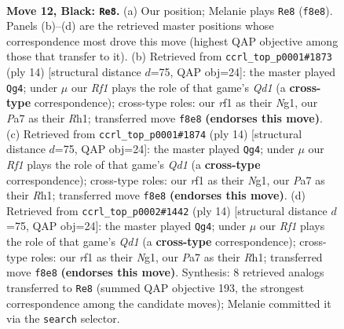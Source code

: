 \documentclass[11pt]{article}
\begin{document}
\clearpage

\begin{figure}[p]\centering
\begin{subfigure}{0.46\textwidth}\centering
\resizebox{\linewidth}{!}{%
\newchessgame
\chessboard[
  setfen={rn3rk1/ppp1bp1p/3q2p1/3pNb2/3P1P1P/6P1/PP2P3/RNBQ1RK1 b - - 0 12},
  showmover=false,
  pgfstyle=straightmove, color=movearrow, markmove={f8-e8}
]}
\caption{}
\end{subfigure}\hfill
\begin{subfigure}{0.46\textwidth}\centering
\resizebox{\linewidth}{!}{%
\newchessgame
\chessboard[
  setfen={rnbqk2r/ppp2pp1/4p2p/3pP3/3Pn3/2P5/P1PB1PPP/R2QKBNR w KQkq - 1 8},
  showmover=false,
  pgfstyle=straightmove, color=movearrow, markmove={d1-g4}
]}
\caption{}
\end{subfigure}
\\[4pt]
\begin{subfigure}{0.46\textwidth}\centering
\resizebox{\linewidth}{!}{%
\newchessgame
\chessboard[
  setfen={rnbqk2r/ppp2pp1/4p2p/3pP3/3Pn3/2P5/P1PB1PPP/R2QKBNR w KQkq - 1 8},
  showmover=false,
  pgfstyle=straightmove, color=movearrow, markmove={d1-g4}
]}
\caption{}
\end{subfigure}\hfill
\begin{subfigure}{0.46\textwidth}\centering
\resizebox{\linewidth}{!}{%
\newchessgame
\chessboard[
  setfen={rnbqk2r/ppp2pp1/4p2p/3pP3/3Pn3/2P5/P1PB1PPP/R2QKBNR w KQkq - 1 8},
  showmover=false,
  pgfstyle=straightmove, color=movearrow, markmove={d1-g4}
]}
\caption{}
\end{subfigure}
\caption{\textbf{Move 12, Black: \texttt{Re8}.} (a) Our position; Melanie plays \texttt{Re8} (\texttt{f8e8}). Panels (b)--(d) are the retrieved master positions whose correspondence most drove this move (highest QAP objective among those that transfer to it). (b) Retrieved from \texttt{ccrl\_top\_p0001\#1873} (ply 14) [structural distance $d$=75, QAP obj=24]: the master played \texttt{Qg4}; under $\mu$ our \emph{Rf1} plays the role of that game's \emph{Qd1} (a \textbf{cross-type} correspondence); cross-type roles: our \emph{r}f1 as their \emph{N}g1, our \emph{P}a7 as their \emph{R}h1; transferred move \texttt{f8e8} \textbf{(endorses this move)}. (c) Retrieved from \texttt{ccrl\_top\_p0001\#1874} (ply 14) [structural distance $d$=75, QAP obj=24]: the master played \texttt{Qg4}; under $\mu$ our \emph{Rf1} plays the role of that game's \emph{Qd1} (a \textbf{cross-type} correspondence); cross-type roles: our \emph{r}f1 as their \emph{N}g1, our \emph{P}a7 as their \emph{R}h1; transferred move \texttt{f8e8} \textbf{(endorses this move)}. (d) Retrieved from \texttt{ccrl\_top\_p0002\#1442} (ply 14) [structural distance $d$=75, QAP obj=24]: the master played \texttt{Qg4}; under $\mu$ our \emph{Rf1} plays the role of that game's \emph{Qd1} (a \textbf{cross-type} correspondence); cross-type roles: our \emph{r}f1 as their \emph{N}g1, our \emph{P}a7 as their \emph{R}h1; transferred move \texttt{f8e8} \textbf{(endorses this move)}. Synthesis: 8 retrieved analogs transferred to \texttt{Re8} (summed QAP objective 193, the strongest correspondence among the candidate moves); Melanie committed it via the \texttt{search} selector.}
\label{fig:thought-m23}
\end{figure}
\end{document}
